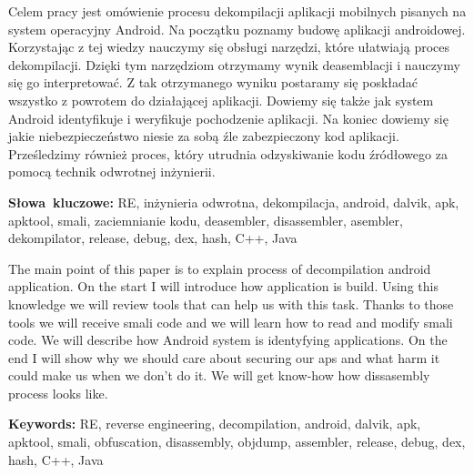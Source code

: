 \documentclass[12pt,a4paper,leqno,oneside,titlepage]{book}
\newenvironment{abstractpage}
  {\cleardoublepage\vspace*{\fill}\thispagestyle{empty}}
  {\vfill\cleardoublepage}
\newenvironment{abstract}[1]
  {\bigskip\selectlanguage{#1}%
   \begin{center}\bfseries\abstractname\end{center}}
  {\par\bigskip}
\begin{document}
\begin{abstractpage}
\begin{abstract}{polish}
Celem pracy jest omówienie procesu dekompilacji aplikacji mobilnych pisanych na system operacyjny Android.
Na początku poznamy budowę aplikacji androidowej. Korzystając z tej wiedzy nauczymy się obsługi narzędzi, które ułatwiają proces dekompilacji. Dzięki tym narzędziom otrzymamy wynik deasemblacji i nauczymy się go interpretować. Z tak otrzymanego wyniku postaramy się poskładać wszystko z powrotem do działającej aplikacji. Dowiemy się także jak system Android identyfikuje i weryfikuje pochodzenie aplikacji. Na koniec dowiemy się jakie niebezpieczeństwo niesie za sobą źle zabezpieczony kod aplikacji. Prześledzimy również proces, który utrudnia odzyskiwanie kodu źródłowego za pomocą technik odwrotnej inżynierii.
 
\end{abstract}
\smallskip
\noindent \textbf{Słowa~kluczowe:} RE, inżynieria odwrotna, dekompilacja, android, dalvik, apk, apktool, smali, zaciemnianie kodu, deasembler, disassembler, asembler, dekompilator, release, debug, dex, hash, C++, Java

\begin{abstract}{english}
The main point of this paper is to explain process of decompilation android application. On the start I will introduce how application is build. Using this knowledge we will review tools that can help us with this task. Thanks to those tools we will receive smali code and we will learn how to read and modify smali code. We will describe how Android system is identyfying applications. On the end I will show why we should care about securing our aps and what harm it could make us when we don't do it. We will get know-how how dissasembly process looks like.
\end{abstract}
\smallskip
\noindent \textbf{Keywords:} RE, reverse engineering, decompilation, android, dalvik, apk, apktool, smali, obfuscation, disassembly, objdump, assembler, release, debug, dex, hash, C++, Java
\end{abstractpage}

\mainmatter

\end{document}
